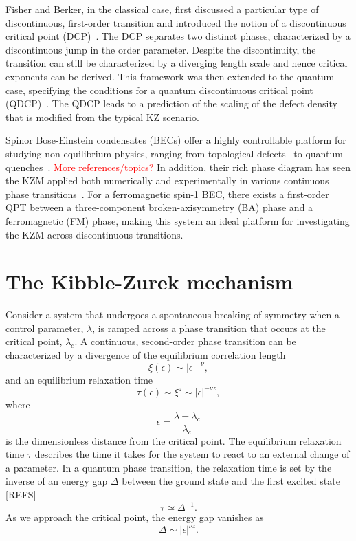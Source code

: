 Fisher and Berker, in the classical case, first discussed a particular type of
discontinuous, first-order transition and introduced the notion of a
discontinuous critical point (DCP)~\cite{Fisher1982}.
The DCP separates two distinct phases, characterized by a discontinuous jump
in the order parameter.
Despite the discontinuity, the transition can still be characterized by a
diverging length scale and hence critical exponents can be derived.
This framework was then extended to the quantum case, specifying the conditions
for a quantum discontinuous critical point (QDCP)~\cite{Suzuki2015}.
The QDCP leads to a prediction of the scaling of the defect density that is
modified from the typical KZ scenario.

Spinor Bose-Einstein condensates (BECs) offer a highly controllable platform
for studying non-equilibrium physics, ranging from topological
defects~\cite{Lovegrove2014, Borgh2016} to quantum
quenches~\cite{Symes2017, Prufer2018, Schmied2019}.
\textcolor{red}{More references/topics?}
In addition, their rich phase diagram has seen the KZM applied both numerically
and experimentally in various continuous phase transitions~\cite{Damski2007,
    Saito2007A, Saito2007B, Swislocki2013, Witkowska2013, Anquez2016}.
For a ferromagnetic spin-1 BEC, there exists a first-order QPT between a
three-component broken-axisymmetry (BA) phase and a ferromagnetic (FM) phase,
making this system an ideal platform for investigating the KZM across
discontinuous transitions.

\section{The Kibble-Zurek mechanism}\label{sec:the-KZM}
Consider a system that undergoes a spontaneous breaking of symmetry when a
control parameter, \( \lambda \), is ramped across a phase transition that occurs
at the critical point, \( \lambda_c \).
A continuous, second-order phase transition can be characterized by a divergence
of the equilibrium correlation length
\begin{equation}
    \xi(\epsilon) \sim |\epsilon|^{-\nu},
\end{equation}
and an equilibrium relaxation time
\begin{equation}
    \tau(\epsilon) \sim \xi^z \sim |\epsilon|^{-\nu z},
    \label{eq: equil-relax-time}
\end{equation}
where
\begin{equation}
    \epsilon = \frac{\lambda - \lambda_c}{\lambda_c}
\end{equation}
is the dimensionless distance from the critical point.
The equilibrium relaxation time \( \tau \) describes the time it takes for the
system to react to an external change of a parameter.
In a quantum phase transition, the relaxation time is set by the inverse of an
energy gap \( \Delta \) between the ground state and the first excited state [REFS]
\begin{equation}
    \tau \simeq \Delta^{-1}.
\end{equation}
As we approach the critical point, the energy gap vanishes as
\begin{equation}
    \Delta \sim |\epsilon|^{\nu z}.
\end{equation}


